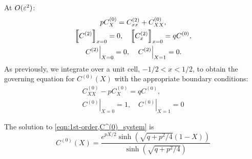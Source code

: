 At \(O(\varepsilon^2)\):
\begin{subequations}
    \label{eqn:1st-order,O(e^2),Pe=O(e),Da=O(e^2)}
    \begin{gather}
        \label{eqn:1st-order,O(e^2)_eqn,Pe=O(e),Da=O(e^2)}
        p C^{(0)}_X = C^{(2)}_{xx} + C^{(0)}_{XX},\\
        \label{eqn:1st-order,(e^2)_jump_cond,Pe=O(e),Da=O(e^2)}
        \left\llbracket C^{(2)} \right\rrbracket_{x=0}=0, \quad \left\llbracket C^{(2)}_x \right\rrbracket_{x=0}=q C^{(0)},\\
        \label{eqn:1st-order,(e^2)_bcs,Pe=O(e),Da=O(e^2)}
        \left.C^{(2)}\right|_{X=0}=0, \quad \left.C^{(2)}\right|_{X=1}=0.
    \end{gather}
\end{subequations}
As previously, we integrate over a unit cell, \(-1/2 < x < 1/2\), to obtain the
governing equation for \(C^{(0)}(X)\) with the appropriate boundary conditions:
\begin{subequations}
    \label{eqn:1st-order,C^(0)_system}
    \begin{gather}
        C^{(0)}_{XX} - p C^{(0)}_X = q C^{(0)},\\
        \left.C^{(0)}\right|_{X=0} = 1, \quad \left.C^{(0)}\right|_{X=1}=0
    \end{gather}
\end{subequations}

The solution to \eqref{eqn:1st-order,C^(0)_system} is
\begin{equation}
    \label{eqn:1st-order,C^(0)_solution}
    C^{(0)}(X) = \frac{e^{pX/2}\sinh\left( \sqrt{q+p^2/4}
(1-X)\right)}{\sinh\left( \sqrt{q+p^2/4} \right)}
\end{equation}
